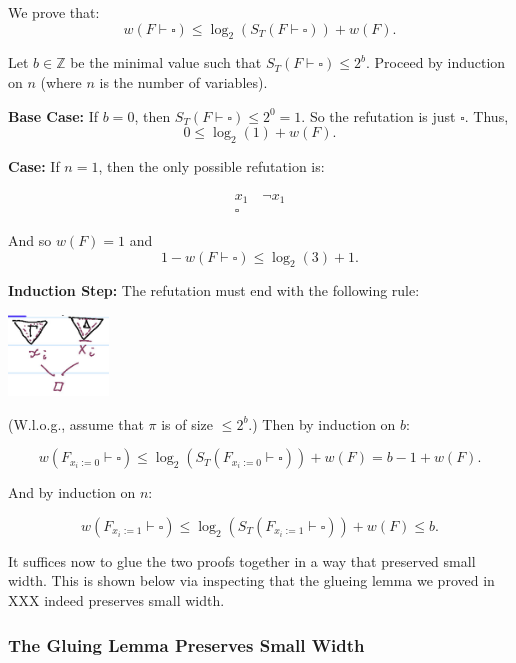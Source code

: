 We prove that:
\[
w(F \vdash \square) \leq \log_2(S_T(F \vdash \square)) + w(F).
\]

Let $b \in \mathbb{Z}$ be the minimal value such that $S_T(F \vdash \square) \leq 2^b$.  
Proceed by induction on $n$ (where $n$ is the number of variables).

\textbf{Base Case:}  
If $b = 0$, then $S_T(F \vdash \square) \leq 2^0 = 1$. So the refutation is just $\square$.  
Thus,  
\[
0 \leq \log_2(1) + w(F).
\]

\textbf{Case:} If $n = 1$, then the only possible refutation is:

\[
\begin{array}{c}
    x_1 \quad \neg x_1 \\
    \hline
    \square
\end{array}
\]

And so $w(F) = 1$ and  
\[
1 - w(F \vdash \square) \leq \log_2(3) + 1.
\]

\textbf{Induction Step:}  
The refutation must end with the following rule:

\includegraphics[width=0.2\textwidth]{images/image016.png}


(W.l.o.g., assume that $\pi$ is of size $\leq 2^b$.) Then by induction on $b$:

\[
w(F_{x_i := 0} \vdash \square) \leq \log_2(S_T(F_{x_i := 0} \vdash \square)) + w(F) = b - 1 + w(F).
\]

And by induction on $n$:

\[
w(F_{x_i := 1} \vdash \square) \leq \log_2(S_T(F_{x_i := 1} \vdash \square)) + w(F) \leq b.
\]

It suffices now to glue the two proofs together in a way that preserved small width.
This is shown below via inspecting that the glueing lemma we proved in XXX indeed preserves small width. 
\subsubsection{The Gluing Lemma Preserves Small Width }

